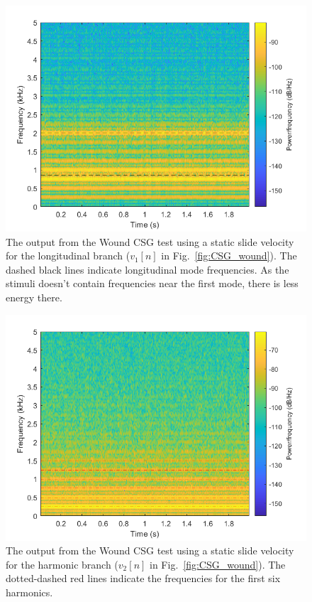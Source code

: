 \documentclass[../main.tex]{subfiles}
\begin{document}
\begin{figure}[h!]
    \centering
    \includegraphics[scale=.57]{./images/plots/CSG_Wound_Static_Long.png}
    \caption{The output from the Wound CSG test using a static slide velocity for the longitudinal branch ($v_1[n]$ in Fig.~\ref{fig:CSG_wound}). The dashed black lines indicate longitudinal mode frequencies. As the stimuli doesn't contain frequencies near the first mode, there is less energy there.}
    \label{fig:CSGWoundStaticLong}
\end{figure}

\begin{figure}[h!]
    \centering
    \includegraphics[scale=.60]{./images/plots/CSG_Wound_Static_Harm.png}
    \caption{The output from the Wound CSG test using a static slide velocity for the harmonic branch ($v_2[n]$ in Fig.~\ref{fig:CSG_wound}). The dotted-dashed red lines indicate the frequencies for the first six harmonics.}
    \label{fig:CSGWoundStaticHarm}
\end{figure}
\end{document}
